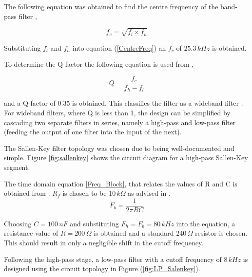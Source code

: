 \documentclass[a4paper, onecolumn, 12pt]{IEEEtran}
\begin{document}
The following equation was obtained to find the centre frequency of the band-pass filter \cite{lancaster1996active},

\begin{equation}
  \label{CentreFreq}
  f_c = \sqrt{f_l \times f_h} \nonumber 
\end{equation}

Substituting $f_l$ and $f_h$ into equation (\ref{CentreFreq}) an $f_c$ of $25.3\,kHz$ is obtained.

To determine the Q-factor  the following equation is used from \cite{lancaster1996active},

\begin{equation}
  \label{QFactor}
  Q = \frac{f_c}{f_h - f_l}
\end{equation}

and a Q-factor of 0.35 is obtained. This classifies the filter as a wideband filter \cite{lancaster1996active}. For wideband filters, where Q is less than 1, the design can be simplified by cascading two separate filters in series, namely a high-pass and low-pass filter (feeding the output of one filter into the input of the next).

The Sallen-Key filter topology was chosen due to being well-documented and simple. Figure \ref{fig:sallenkey} shows the circuit diagram for a high-pass Sallen-Key segment.

The time domain equation \ref{Freq_Block}, that relates the values of R and C is obtained from \cite{lancaster1996active}. $R_f$ is chosen to be $10\,k\Omega$ as advised in \cite{lancaster1996active}. 
\begin{equation}
  F_b = \frac{1}{2\pi R C}
  \label{Freq_Block}
\end{equation}

Choosing $C = 100\,nF$ and substituting $F_h = F_b = 80\,kHz$ into the equation, a resistance value of $R = 200\,\Omega$ is obtained and a standard $240\,\Omega$ resistor is chosen. This should result in only a negligible shift in the cutoff frequency.

Following the high-pass stage, a low-pass filter with a cutoff frequency of $8\,kHz$ is designed using the circuit topology in Figure (\ref{fig:LP_Salenkey}).
\end{document}
